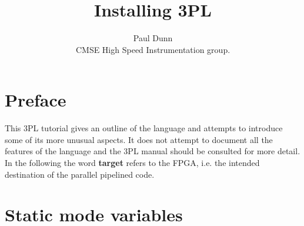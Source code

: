 \documentclass[12pt,a4paper,twoside,fleqn]{article}
\title{{\bf Installing 3PL}}
\author{Paul Dunn \\
CMSE High Speed Instrumentation group.}
\date{\fixdate}
\begin{document}
     
\maketitle


\section{Preface}

    This 3PL tutorial gives an outline of the language and attempts to introduce
    some of its more unusual aspects. It does not attempt to document all the
    features of the language and the 3PL manual should be consulted for more
    detail. In the following the word {\bf target} refers to the FPGA, i.e. the
    intended destination of the parallel pipelined code.

\section{Static mode variables}
\end{document}
